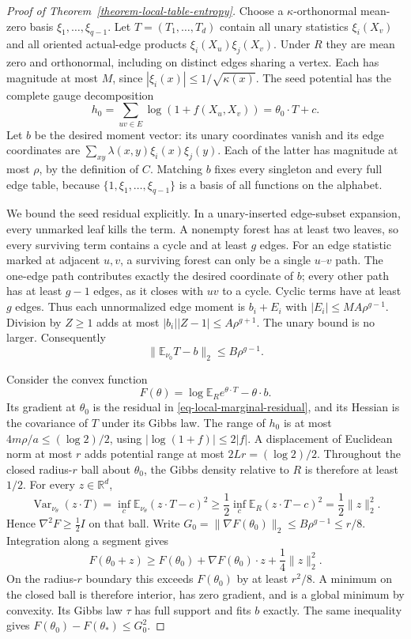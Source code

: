 \documentclass[a4paper,11pt,reqno]{amsart}
\theoremstyle{plain}
\theoremstyle{definition}
\theoremstyle{remark}
\begin{document}
\begin{proof}[Proof of Theorem~\ref{theorem-local-table-entropy}]
Choose a $\kappa$-orthonormal mean-zero basis
$\xi_1,\ldots,\xi_{q-1}$.  Let $T=(T_1,\ldots,T_d)$ contain all unary
statistics $\xi_i(X_v)$ and all oriented actual-edge products
$\xi_i(X_u)\xi_j(X_v)$.  Under $R$ they are mean zero and orthonormal,
including on distinct edges sharing a vertex.  Each has magnitude at most
$M$, since $|\xi_i(x)|\le1/\sqrt{\kappa(x)}$.
The seed potential has the complete gauge decomposition
\[
 h_0=\sum_{uv\in E}\log(1+f(X_u,X_v))=\theta_0\cdot T+c.
\]
Let $b$ be the desired moment vector: its unary coordinates vanish and its
edge coordinates are $\sum_{xy}\lambda(x,y)\xi_i(x)\xi_j(y)$.
Each of the latter has magnitude at most $\rho$, by the definition of $C$.
Matching $b$ fixes every singleton and every full edge table, because
$\{1,\xi_1,\ldots,\xi_{q-1}\}$ is a basis of all functions on the alphabet.

We bound the seed residual explicitly.  In a unary-inserted edge-subset
expansion, every unmarked leaf kills the term.  A nonempty forest has at
least two leaves, so every surviving term contains a cycle and at least
$g$ edges.  For an edge statistic marked at adjacent $u,v$, a surviving
forest can only be a single $u$--$v$ path.  The one-edge path contributes
exactly the desired coordinate of $b$; every other path has at least
$g-1$ edges, as it closes with $uv$ to a cycle.  Cyclic terms have at least
$g$ edges.  Thus each unnormalized edge moment is $b_i+E_i$ with
$|E_i|\le MA\rho^{g-1}$.  Division by $Z\ge1$ adds at most
$|b_i||Z-1|\le A\rho^{g+1}$.  The unary bound is no larger.  Consequently
\begin{equation}\label{eq-local-marginal-residual}
 \|\mathbb E_{\nu_0}T-b\|_2\le B\rho^{g-1}.
\end{equation}

Consider the convex function
\[
 F(\theta)=\log\mathbb E_R e^{\theta\cdot T}-\theta\cdot b.
\]
Its gradient at $\theta_0$ is the residual in
\eqref{eq-local-marginal-residual}, and its Hessian is the covariance of
$T$ under its Gibbs law.  The range of $h_0$ is at most
$4m\rho/a\le(\log2)/2$, using $|\log(1+f)|\le2|f|$.
A displacement of Euclidean norm at most $r$ adds potential range at most
$2Lr=(\log2)/2$.  Throughout the closed radius-$r$ ball about $\theta_0$,
the Gibbs density relative to $R$ is therefore at least $1/2$.
For every $z\in\mathbb R^d$,
\[
 \operatorname{Var}_{\nu_\theta}(z\cdot T)
 =\inf_c\mathbb E_{\nu_\theta}(z\cdot T-c)^2
 \ge\frac12\inf_c\mathbb E_R(z\cdot T-c)^2
 =\frac12\|z\|_2^2.
\]
Hence $\nabla^2F\ge\tfrac12I$ on that ball.
Write $G_0=\|\nabla F(\theta_0)\|_2\le B\rho^{g-1}\le r/8$.
Integration along a segment gives
\[
 F(\theta_0+z)\ge F(\theta_0)+\nabla F(\theta_0)\cdot z
                              +\frac14\|z\|_2^2.
\]
On the radius-$r$ boundary this exceeds $F(\theta_0)$ by at least $r^2/8$.
A minimum on the closed ball is therefore interior, has zero gradient,
and is a global minimum by convexity.  Its Gibbs law $\tau$ has full
support and fits $b$ exactly.  The same inequality gives
$F(\theta_0)-F(\theta_*)\le G_0^2$.


\end{proof}
\end{document}
